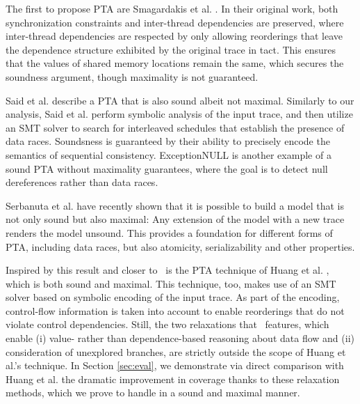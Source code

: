 The first to propose PTA are Smagardakis et al. \cite{XXX}. In their original work, both synchronization constraints and inter-thread dependencies are preserved, where inter-thread dependencies are respected by 
only allowing reorderings that leave the dependence structure exhibited by the original trace in tact. This ensures that the values of shared memory locations remain the same, which secures the soundness argument, though maximality is not guaranteed.

Said et al. \cite{XXX} describe a PTA that is also sound albeit not maximal. Similarly to our analysis, Said et al. perform symbolic analysis of the input trace, and then utilize an SMT solver to search for interleaved schedules that establish the presence of data races. Soundsness is guaranteed by their ability to precisely encode the semantics of sequential consistency. ExceptionNULL \cite{XXX} is another example of a sound PTA without maximality guarantees, where the goal is to detect null dereferences rather than data races. 

Serbanuta et al. \cite{XXX} have recently shown that it is possible to build a model that is not only sound but also maximal: Any extension of the model with a new trace renders the model unsound. This provides a foundation for different forms of PTA, including data races, but also atomicity, serializability and other properties. 

Inspired by this result and closer to \tool\ is the PTA technique of Huang et al. \cite{XXX}, which is both sound and maximal. This technique, too, makes use of an SMT solver based on symbolic encoding of the input trace. As part of the encoding, control-flow information is taken into account to enable reorderings that do not violate control dependencies. Still, the two relaxations that \tool\ features, which enable (i) value- rather than dependence-based reasoning about data flow and (ii) consideration of unexplored branches, are strictly outside the scope of Huang et al.'s technique. In Section \ref{sec:eval}, we demonstrate via direct comparison with Huang et al. the dramatic improvement in coverage thanks to these relaxation methods, which we prove to handle in a sound and maximal manner.


